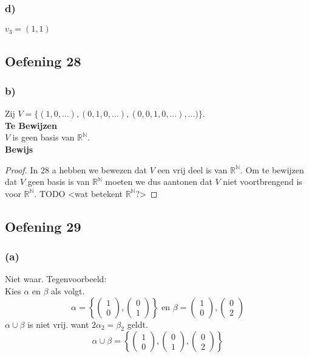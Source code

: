 \documentclass[lineaire_algebra_oplossingen.tex]{subfiles}
\begin{document}
\subsubsection*{d)}
$v_3 = (1,1)$

\subsection{Oefening 28}
\subsubsection*{b)}
Zij $V = \{(1,0,...),(0,1,0,...),(0,0,1,0,...),...)\}$.\\
\textbf{Te Bewijzen}\\
$V$ is geen basis van $\mathbb{R}^\mathbb{N}$.\\
\textbf{Bewijs}
\begin{proof}
In 28 a hebben we bewezen dat $V$ een vrij deel is van $\mathbb{R}^\mathbb{N}$. Om te bewijzen dat $V$ geen basis is van $\mathbb{R}^\mathbb{N}$ moeten we dus aantonen dat $V$ niet voortbrengend is voor $\mathbb{R}^\mathbb{N}$.
TODO <wat betekent $\mathbb{R}^\mathbb{N}$?>
\end{proof}


\subsection{Oefening 29}
\subsubsection*{(a)}
Niet waar. Tegenvoorbeeld:\\
Kies $\alpha$ en $\beta$ als volgt.
\[
\alpha =
\left\{
\begin{pmatrix}
1\\0
\end{pmatrix}
,
\begin{pmatrix}
0\\1
\end{pmatrix}
\right\}
\text{ en }
\beta
=
\begin{pmatrix}
1\\0
\end{pmatrix}
,
\begin{pmatrix}
0\\2
\end{pmatrix}
\]
$\alpha\cup\beta$ is niet vrij. want $2\alpha_2 = \beta_2$ geldt.
\[
\alpha\cup\beta = 
\left\{
\begin{pmatrix}
1\\0
\end{pmatrix}
,
\begin{pmatrix}
0\\1
\end{pmatrix}
,
\begin{pmatrix}
0\\2
\end{pmatrix}
\right\}
\]
\end{document}

